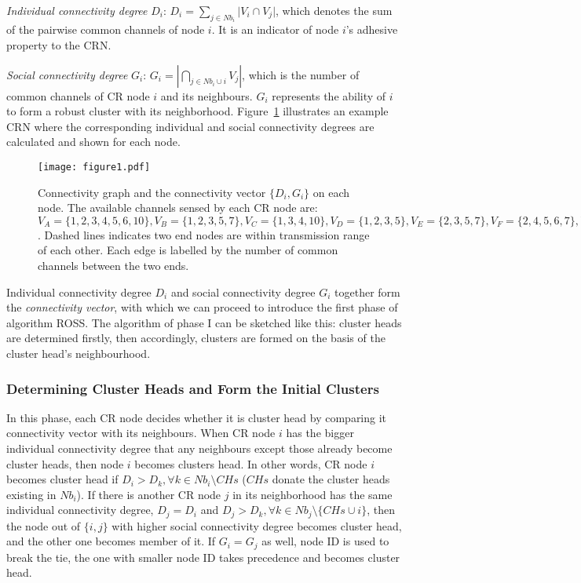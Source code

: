 \textit{Individual connectivity degree} $D_i$: $D_i=\sum_{j\in Nb_i}\vert V_i\cap V_j\vert$, which denotes the sum of the pairwise common channels of node $i$. 
It is an indicator of node $i$'s adhesive property to the CRN. 

\textit{Social connectivity degree} $G_i$: $G_i=|\bigcap_{j\in Nb_i\cup i}V_j|$, which is the number of common channels of CR node $i$ and its neighbours.
$G_i$ represents the ability of $i$ to form a robust cluster with its neighborhood.
Figure~\ref{fig1} illustrates an example CRN where the corresponding individual and social connectivity degrees are calculated and shown for each node.
\begin{figure}[ht!]
  \centering
\texttt{[image: figure1.pdf]}
	\caption{Connectivity graph and the connectivity vector $\{D_i, G_i\}$ on each node. The available channels sensed by each CR node are: $V_A=\{1,2,3,4,5,6,10\}, V_B=\{1,2,3,5,7\}, V_C=\{1,3,4,10\}, V_D=\{1,2,3,5\}, V_E=\{2,3,5,7\}, V_F=\{2,4,5,6,7\}, V_G=\{1,2,3,4,8\}, V_H=\{1,2,5,8\}$. Dashed lines indicates two end nodes are within transmission range of each other. Each edge is labelled by the number of common channels between the two ends.}
	\label{fig1}
\end{figure}
Individual connectivity degree $D_i$ and social connectivity degree $G_i$ together form the \textit{connectivity vector}, with which we can proceed to introduce the first phase of algorithm ROSS.
The algorithm of phase I can be sketched like this: cluster heads are determined firstly, then accordingly, clusters are formed on the basis of the cluster head's neighbourhood.

\subsubsection{Determining Cluster Heads and Form the Initial Clusters}
In this phase, each CR node decides whether it is cluster head by comparing it connectivity vector with its neighbours.
When CR node $i$ has the bigger individual connectivity degree that any neighbours except those already become cluster heads, then node $i$ becomes clusters head.
In other words, CR node $i$ becomes cluster head if $D_i > D_k, \forall k\in Nb_i\setminus CHs$ ($CHs$ donate the cluster heads existing in $Nb_i$).
If there is another CR node $j$ in its neighborhood has the same individual connectivity degree, \ie $D_j = D_i$ and $D_j > D_{k}, \forall k\in Nb_j\setminus \{CHs\cup i\}$, then the node out of $\{i, j\}$ with higher social connectivity degree becomes cluster head, and the other one becomes member of it. 
If $G_i = G_j$ as well, node ID is used to break the tie, \ie the one with smaller node ID takes precedence and becomes cluster head.

